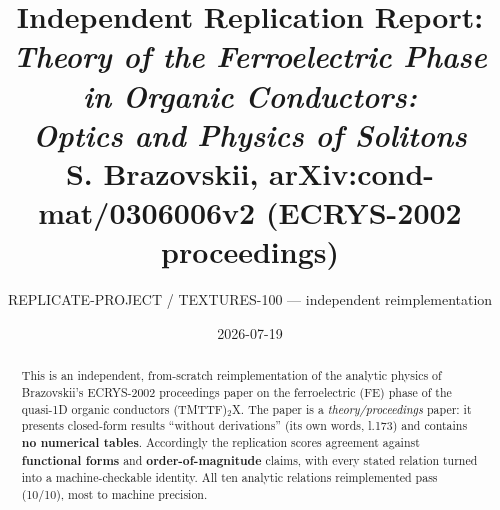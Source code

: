 \documentclass[11pt]{article}
\title{Independent Replication Report:\\
\emph{Theory of the Ferroelectric Phase in Organic Conductors:\\ Optics and Physics of Solitons}\\
\large S. Brazovskii, arXiv:cond-mat/0306006v2 (ECRYS-2002 proceedings)}
\author{REPLICATE-PROJECT / TEXTURES-100 --- independent reimplementation}
\date{2026-07-19}
\begin{document}
\maketitle

\begin{abstract}
This is an independent, from-scratch reimplementation of the analytic physics of
Brazovskii's ECRYS-2002 proceedings paper on the ferroelectric (FE) phase of the
quasi-1D organic conductors (TMTTF)$_2$X. The paper is a \emph{theory/proceedings}
paper: it presents closed-form results ``without derivations'' (its own words,
l.173) and contains \textbf{no numerical tables}. Accordingly the replication
scores agreement against \textbf{functional forms} and \textbf{order-of-magnitude}
claims, with every stated relation turned into a machine-checkable identity.
All ten analytic relations reimplemented pass (10/10), most to machine precision.

\medskip
\noindent{}
\end{abstract}
\end{document}
